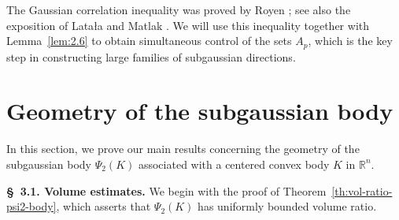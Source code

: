 \documentclass[11pt,leqno]{article}
\theoremstyle{definition}
\numberwithin{equation}{section}
\begin{document}
The Gaussian correlation inequality was proved by Royen \cite{Royen-2014}; see also the exposition of Lata{\l}a and Matlak \cite{LM17}. 
We will use this inequality together with Lemma~\ref{lem:2.6} to obtain simultaneous control of the sets 
$A_p$, which is the key step in constructing large families of subgaussian directions.


\section{Geometry of the subgaussian body}\label{section:3}

In this section, we prove our main results concerning the geometry of the subgaussian body $\Psi_2(K)$ associated with a centered convex body $K$ in
$\mathbb{R}^n$. 

\medskip 

\noindent \textbf{\S~3.1. Volume estimates.} We begin with the proof of Theorem~\ref{th:vol-ratio-psi2-body}, which asserts that $\Psi_2(K)$ has uniformly bounded volume
ratio.
\end{document}
